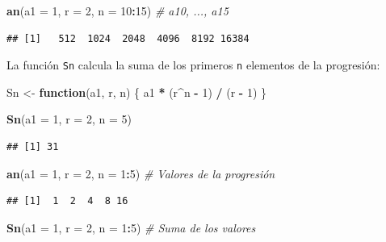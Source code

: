 \documentclass[]{book}
\newenvironment{Shaded}{\begin{snugshade}}{\end{snugshade}}
\newcommand{\CommentTok}[1]{\textcolor[rgb]{0.56,0.35,0.01}{\textit{#1}}}
\newcommand{\ControlFlowTok}[1]{\textcolor[rgb]{0.13,0.29,0.53}{\textbf{#1}}}
\newcommand{\DataTypeTok}[1]{\textcolor[rgb]{0.13,0.29,0.53}{#1}}
\newcommand{\DecValTok}[1]{\textcolor[rgb]{0.00,0.00,0.81}{#1}}
\newcommand{\KeywordTok}[1]{\textcolor[rgb]{0.13,0.29,0.53}{\textbf{#1}}}
\newcommand{\NormalTok}[1]{#1}
\newcommand{\OperatorTok}[1]{\textcolor[rgb]{0.81,0.36,0.00}{\textbf{#1}}}
\newcommand{\StringTok}[1]{\textcolor[rgb]{0.31,0.60,0.02}{#1}}
\begin{document}
\begin{Shaded}
\begin{Highlighting}[]
\KeywordTok{an}\NormalTok{(}\DataTypeTok{a1 =} \DecValTok{1}\NormalTok{, }\DataTypeTok{r =} \DecValTok{2}\NormalTok{, }\DataTypeTok{n =} \DecValTok{10}\OperatorTok{:}\DecValTok{15}\NormalTok{)  }\CommentTok{# a10, ..., a15}
\end{Highlighting}
\end{Shaded}

\begin{verbatim}
## [1]   512  1024  2048  4096  8192 16384
\end{verbatim}

La función \texttt{Sn} calcula la suma de los primeros \texttt{n}
elementos de la progresión:

\begin{Shaded}
\begin{Highlighting}[]
\NormalTok{Sn <-}\StringTok{ }\ControlFlowTok{function}\NormalTok{(a1, r, n) \{}
\NormalTok{        a1 }\OperatorTok{*}\StringTok{ }\NormalTok{(r}\OperatorTok{^}\NormalTok{n }\OperatorTok{-}\StringTok{ }\DecValTok{1}\NormalTok{) }\OperatorTok{/}\StringTok{ }\NormalTok{(r }\OperatorTok{-}\StringTok{ }\DecValTok{1}\NormalTok{)}
\NormalTok{      \}}
  
\KeywordTok{Sn}\NormalTok{(}\DataTypeTok{a1 =} \DecValTok{1}\NormalTok{, }\DataTypeTok{r =} \DecValTok{2}\NormalTok{, }\DataTypeTok{n =} \DecValTok{5}\NormalTok{)}
\end{Highlighting}
\end{Shaded}

\begin{verbatim}
## [1] 31
\end{verbatim}

\begin{Shaded}
\begin{Highlighting}[]
\KeywordTok{an}\NormalTok{(}\DataTypeTok{a1 =} \DecValTok{1}\NormalTok{, }\DataTypeTok{r =} \DecValTok{2}\NormalTok{, }\DataTypeTok{n =} \DecValTok{1}\OperatorTok{:}\DecValTok{5}\NormalTok{)    }\CommentTok{# Valores de la progresión}
\end{Highlighting}
\end{Shaded}

\begin{verbatim}
## [1]  1  2  4  8 16
\end{verbatim}

\begin{Shaded}
\begin{Highlighting}[]
\KeywordTok{Sn}\NormalTok{(}\DataTypeTok{a1 =} \DecValTok{1}\NormalTok{, }\DataTypeTok{r =} \DecValTok{2}\NormalTok{, }\DataTypeTok{n =} \DecValTok{1}\OperatorTok{:}\DecValTok{5}\NormalTok{)    }\CommentTok{# Suma de los valores}
\end{Highlighting}
\end{Shaded}
\end{document}
